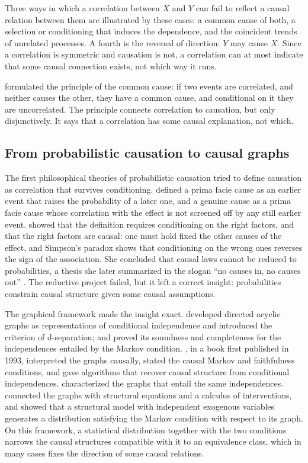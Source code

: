 \documentclass{situationist-preprint}
\begin{document}
Three ways in which a correlation between $X$ and $Y$ can fail to reflect a causal relation between them are illustrated by these cases: a common cause of both, a selection or conditioning that induces the dependence, and the coincident trends of unrelated processes. A fourth is the reversal of direction: $Y$ may cause $X$. Since a correlation is symmetric and causation is not, a correlation can at most indicate that some causal connection exists, not which way it runs.

\citet{Reichenbach1956} formulated the principle of the common cause: if two events are correlated, and neither causes the other, they have a common cause, and conditional on it they are uncorrelated. The principle connects correlation to causation, but only disjunctively. It says that a correlation has some causal explanation, not which.

\subsection{From probabilistic causation to causal graphs}\label{s:history}

The first philosophical theories of probabilistic causation tried to define causation as correlation that survives conditioning. \citet{Suppes1970} defined a prima facie cause as an earlier event that raises the probability of a later one, and a genuine cause as a prima facie cause whose correlation with the effect is not screened off by any still earlier event. \citet{Cartwright1979} showed that the definition requires conditioning on the right factors, and that the right factors are causal: one must hold fixed the other causes of the effect, and Simpson's paradox shows that conditioning on the wrong ones reverses the sign of the association. She concluded that causal laws cannot be reduced to probabilities, a thesis she later summarized in the slogan \enquote{no causes in, no causes out} \citep{Cartwright1989}. The reductive project failed, but it left a correct insight: probabilities constrain causal structure given some causal assumptions.

The graphical framework made the insight exact. \citet{Pearl1988} developed directed acyclic graphs as representations of conditional independence and introduced the criterion of d-separation; \citet{Geiger1990} and \citet{Lauritzen1990} proved its soundness and completeness for the independences entailed by the Markov condition. \citet{SGS2000}, in a book first published in 1993, interpreted the graphs causally, stated the causal Markov and faithfulness conditions, and gave algorithms that recover causal structure from conditional independences. \citet{Verma1990} characterized the graphs that entail the same independences. \citet{Pearl2009} connected the graphs with structural equations and a calculus of interventions, and showed that a structural model with independent exogenous variables generates a distribution satisfying the Markov condition with respect to its graph. On this framework, a statistical distribution together with the two conditions narrows the causal structures compatible with it to an equivalence class, which in many cases fixes the direction of some causal relations.
\end{document}
